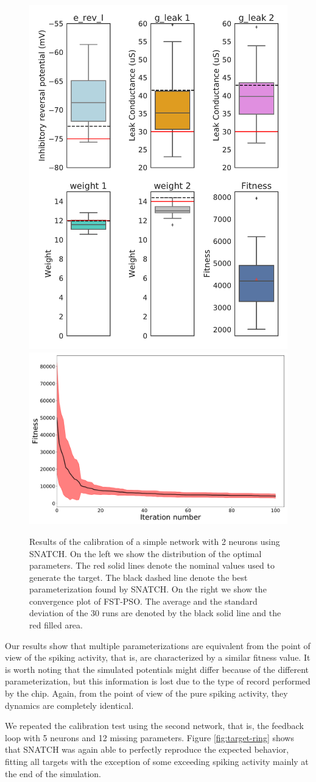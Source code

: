 \documentclass[utf8]{frontiersFPHY} %
\newcommand {\name}{SNATCH}
\begin{document}
\begin{figure}[!ht]
	\centering
	\includegraphics[width=.25\textwidth]{images/2-neurons-irregular/boxplot_best_values.pdf}
	\includegraphics[width=.49\textwidth]{images/2-neurons-irregular/mean.pdf}
	\caption{Results of the calibration of a simple network with 2 neurons using \name{}. On the left we show the distribution of the optimal parameters. The red solid lines denote the nominal values used to generate the target. The black dashed line denote the best parameterization found by \name{}. On the right we show the convergence plot of FST-PSO. The average and the standard deviation of the 30 runs are denoted by the black solid line and the red filled area.}
	\label{fig:boxplots-2neurons}
\end{figure}

Our results show that multiple parameterizations are equivalent from the point of view of the spiking activity, that is, are characterized by a similar fitness value.
It is worth noting that the simulated potentials might differ because of the different parameterization, but this information is lost due to the type of record performed by the chip. 
Again, from the point of view of the pure spiking activity, they dynamics are  completely identical.

We repeated the calibration test using the second network, that is, the feedback loop with 5 neurons and 12 missing parameters. 
Figure \ref{fig:target-ring} shows that \name{} was again able to perfectly reproduce the expected behavior, fitting all targets with the exception of some exceeding spiking activity mainly at the end of the simulation.
\end{document}
